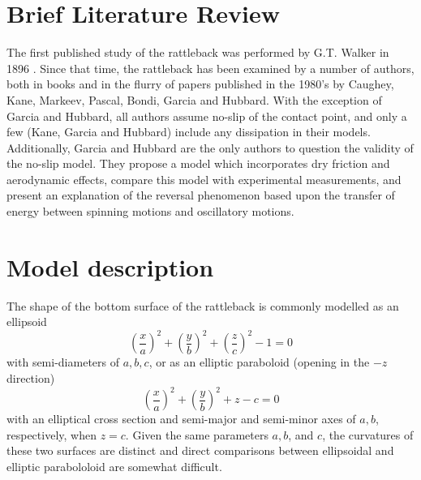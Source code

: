 \documentclass[letterpaper,11pt]{article}
\begin{document}

  \section{Brief Literature Review}
  The first published study of the rattleback was performed by G.T. Walker in
  1896 \cite{Walker1896}.  Since that time, the rattleback has been examined by a number of
  authors, both in books \cite{Routh1905a, Bloch2003} and in the flurry of
  papers published in the 1980's by Caughey, Kane, Markeev, Pascal, Bondi,
  Garcia and Hubbard.  With the exception of Garcia and Hubbard, all authors
  assume no-slip of the contact point, and only a few (Kane, Garcia and
  Hubbard) include any dissipation in their models.  Additionally, Garcia and
  Hubbard are the only authors to question the validity of the no-slip model.
  They propose a model which incorporates dry friction and aerodynamic effects,
  compare this model with experimental measurements, and present an explanation
  of the reversal phenomenon based upon the transfer of energy between spinning
  motions and oscillatory motions.

  \section{Model description}
  The shape of the bottom surface of the rattleback is commonly modelled as an
  ellipsoid
  \[
    \left(\frac{x}{a}\right)^2 + \left(\frac{y}{b}\right)^2 + \left(\frac{z}{c}\right)^2 - 1 = 0
  \]
  with semi-diameters of $a, b, c$, or as an elliptic paraboloid (opening in the $-z$ direction)
  \[
    \left(\frac{x}{a}\right)^2 + \left(\frac{y}{b}\right)^2 + z - c = 0
  \]
  with an elliptical cross section and semi-major and semi-minor axes of $a,
  b$, respectively, when $z=c$.  Given the same parameters $a, b$, and $c$, the
  curvatures of these two surfaces are distinct and direct comparisons between
  ellipsoidal and elliptic parabololoid are somewhat difficult.
\end{document}
